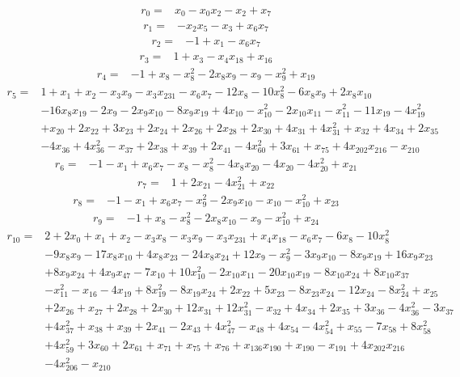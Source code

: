 \begingroup\footnotesize
\setlength{\jot}{1pt}
\[\begin{aligned}
r_{0}={}&x_{0}-x_{0}x_{2}-x_{2}+x_{7}
\end{aligned}\]
\[\begin{aligned}
r_{1}={}&-x_{2}x_{5}-x_{3}+x_{6}x_{7}
\end{aligned}\]
\[\begin{aligned}
r_{2}={}&-1+x_{1}-x_{6}x_{7}
\end{aligned}\]
\[\begin{aligned}
r_{3}={}&1+x_{3}-x_{4}x_{18}+x_{16}
\end{aligned}\]
\[\begin{aligned}
r_{4}={}&-1+x_{8}-x_{8}^{2}-2x_{8}x_{9}-x_{9}-x_{9}^{2}+x_{19}
\end{aligned}\]
\[\begin{aligned}
r_{5}={}&1+x_{1}+x_{2}-x_{3}x_{9}-x_{3}x_{231}-x_{6}x_{7}-12x_{8}-10x_{8}^{2}-6x_{8}x_{9}+2x_{8}x_{10}
\\ &-16x_{8}x_{19}-2x_{9}-2x_{9}x_{10}-8x_{9}x_{19}+4x_{10}-x_{10}^{2}-2x_{10}x_{11}-x_{11}^{2}-11x_{19}-4x_{19}^{2}
\\ &+x_{20}+2x_{22}+3x_{23}+2x_{24}+2x_{26}+2x_{28}+2x_{30}+4x_{31}+4x_{31}^{2}+x_{32}+4x_{34}+2x_{35}
\\ &-4x_{36}+4x_{36}^{2}-x_{37}+2x_{38}+x_{39}+2x_{41}-4x_{60}^{2}+3x_{61}+x_{75}+4x_{202}x_{216}-x_{210}
\end{aligned}\]
\[\begin{aligned}
r_{6}={}&-1-x_{1}+x_{6}x_{7}-x_{8}-x_{8}^{2}-4x_{8}x_{20}-4x_{20}-4x_{20}^{2}+x_{21}
\end{aligned}\]
\[\begin{aligned}
r_{7}={}&1+2x_{21}-4x_{21}^{2}+x_{22}
\end{aligned}\]
\[\begin{aligned}
r_{8}={}&-1-x_{1}+x_{6}x_{7}-x_{9}^{2}-2x_{9}x_{10}-x_{10}-x_{10}^{2}+x_{23}
\end{aligned}\]
\[\begin{aligned}
r_{9}={}&-1+x_{8}-x_{8}^{2}-2x_{8}x_{10}-x_{9}-x_{10}^{2}+x_{24}
\end{aligned}\]
\[\begin{aligned}
r_{10}={}&2+2x_{0}+x_{1}+x_{2}-x_{3}x_{8}-x_{3}x_{9}-x_{3}x_{231}+x_{4}x_{18}-x_{6}x_{7}-6x_{8}-10x_{8}^{2}
\\ &-9x_{8}x_{9}-17x_{8}x_{10}+4x_{8}x_{23}-24x_{8}x_{24}+12x_{9}-x_{9}^{2}-3x_{9}x_{10}-8x_{9}x_{19}+16x_{9}x_{23}
\\ &+8x_{9}x_{24}+4x_{9}x_{47}-7x_{10}+10x_{10}^{2}-2x_{10}x_{11}-20x_{10}x_{19}-8x_{10}x_{24}+8x_{10}x_{37}
\\ &-x_{11}^{2}-x_{16}-4x_{19}+8x_{19}^{2}-8x_{19}x_{24}+2x_{22}+5x_{23}-8x_{23}x_{24}-12x_{24}-8x_{24}^{2}+x_{25}
\\ &+2x_{26}+x_{27}+2x_{28}+2x_{30}+12x_{31}+12x_{31}^{2}-x_{32}+4x_{34}+2x_{35}+3x_{36}-4x_{36}^{2}-3x_{37}
\\ &+4x_{37}^{2}+x_{38}+x_{39}+2x_{41}-2x_{43}+4x_{47}^{2}-x_{48}+4x_{54}-4x_{54}^{2}+x_{55}-7x_{58}+8x_{58}^{2}
\\ &+4x_{59}^{2}+3x_{60}+2x_{61}+x_{71}+x_{75}+x_{76}+x_{136}x_{190}+x_{190}-x_{191}+4x_{202}x_{216}
\\ &-4x_{206}^{2}-x_{210}
\end{aligned}\]
